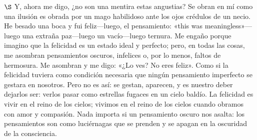 \documentclass[a4paper, 12pt]{article}
\begin{document}
$\S$ Y, ahora me digo, ¿no son una mentira estas angustias? Se obran en mí como
una ilusión es obrada por un mago habilidoso ante los ojos crédulos de un necio.
He besado una boca y fui feliz---luego, el pensamiento: «this was
meaningless»---luego una extraña paz---luego un vacío---luego ternura. Me engaño
porque imagino que la felicidad es un estado ideal y perfecto; pero, en todas
las cosas, me asombran pensamientos oscuros, infelices o, por lo menos, faltos
de hermosura. Me asombran y me digo: «¿Lo ves? No eres feliz». Como si la
felicidad tuviera como condición necesaria que ningún pensamiento imperfecto se
gestara en nosotros. Pero no es así: se gestan, aparecen, y es nuestro deber
dejarlos ser: verlos pasar como estrellas fugaces en un cielo baldío. La
felicidad es vivir en el reino de los cielos; vivimos en el reino de los cielos
cuando obramos con amor y compasión. Nada importa si un pensamiento oscuro nos
asalta: los pensamientos son como luciérnagas que se prenden y se apagan en la
oscuridad de la consciencia.
\end{document}
